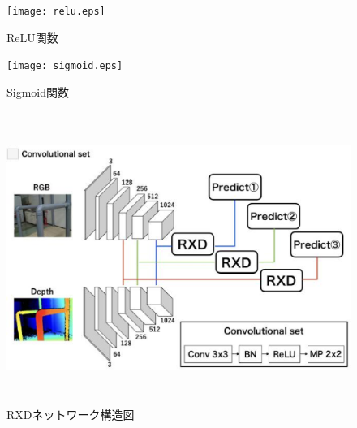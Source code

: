 \clearpage
\begin{figure}[htbt]
	\centering
	 \texttt{[image: relu.eps]}
	 \caption{ReLU関数}
	 \label{fig:f2}
\end{figure}

\begin{figure}[htbt]
	\centering
	 \texttt{[image: sigmoid.eps]}
	 \caption{Sigmoid関数}
	 \label{fig:f2}
\end{figure}


\begin{figure}[htbt]
	\centering
	 \includegraphics[height=95mm]{rxdnet.eps}
	 \caption{RXDネットワーク構造図}
	 \label{fig:f2}
\end{figure}

